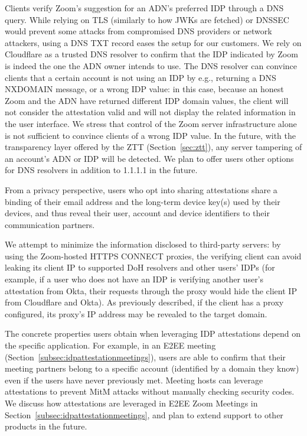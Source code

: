 Clients verify Zoom's suggestion for an ADN's preferred IDP through a DNS query. While relying on
TLS (similarly to how JWKs are fetched) or DNSSEC would prevent some attacks from compromised DNS
providers or network attackers, using a DNS TXT record eases the setup for our customers. We rely on
Cloudflare as a trusted DNS resolver to confirm that the IDP indicated by Zoom is indeed the one the
ADN owner intends to use. The DNS resolver can convince clients that a certain account is not using
an IDP by e.g., returning a DNS NXDOMAIN message, or a wrong IDP value: in this case, because an
honest Zoom and the ADN have returned different IDP domain values, the client will not consider the
attestation valid and will not display the related information in the user interface. We stress that
control of the Zoom server infrastructure alone is not sufficient to convince clients of a wrong IDP
value. In the future, with the transparency layer offered by the ZTT (Section~\ref{sec:ztt}), any
server tampering of an account’s ADN or IDP will be detected. We plan to offer users other options
for DNS resolvers in addition to 1.1.1.1 in the future.

From a privacy perspective, users who opt into sharing attestations share a binding of their email
address and the long-term device key(s) used by their devices, and thus reveal their user, account
and device identifiers to their communication partners. 

We attempt to minimize the information disclosed to third-party servers: by using the Zoom-hosted
HTTPS CONNECT proxies, the verifying client can avoid leaking its client IP to supported DoH
resolvers and other users' IDPs (for example, if a user who does not have an IDP is verifying
another user's attestation from Okta, their requests through the proxy would hide the client IP from
Cloudflare and Okta). As previously described, if the client has a proxy configured, its proxy's IP
address may be revealed to the target domain.

The concrete properties users obtain when leveraging IDP attestations depend on the specific
application. For example, in an E2EE meeting (Section~\ref{subsec:idpattestationmeetings}), users
are able to confirm that their meeting partners belong to a specific account (identified by a domain
they know) even if the users have never previously met. Meeting hosts can leverage attestations to
prevent MitM attacks without manually checking security codes. We discuss how attestations are
leveraged in E2EE Zoom Meetings in Section~\ref{subsec:idpattestationmeetings}, and plan to extend
support to other products in the future.
